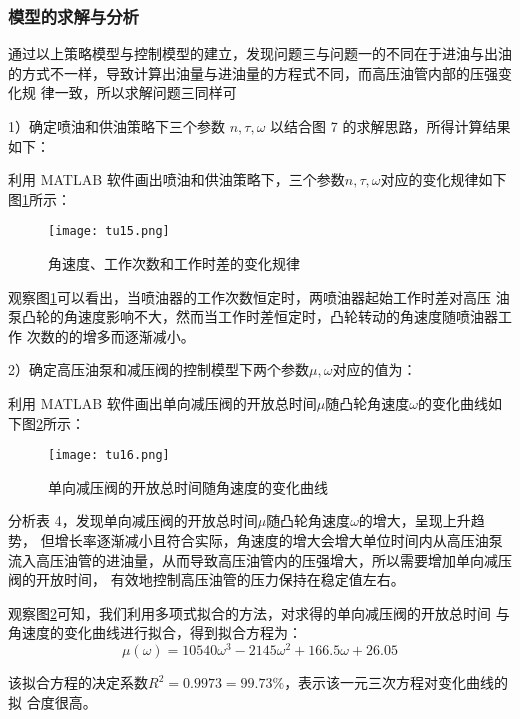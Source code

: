 \documentclass{cumcmthesis}
\begin{document}
\subsubsection{模型的求解与分析 }
通过以上策略模型与控制模型的建立，发现问题三与问题一的不同在于进油与出油 的方式不一样，导致计算出油量与进油量的方程式不同，而高压油管内部的压强变化规 律一致，所以求解问题三同样可

1）确定喷油和供油策略下三个参数 $n,\tau,\omega$ 以结合图 7 的求解思路，所得计算结果如下： 

利用 MATLAB 软件画出喷油和供油策略下，三个参数$n,\tau,\omega$对应的变化规律如下 图\ref{fig:15}所示： 

 \begin{figure}[htb] \centering 
	
	\texttt{[image: tu15.png]} 
	
	\caption{角速度、工作次数和工作时差的变化规律 } \label{fig:15}
\end{figure}  

观察图\ref{fig:15}可以看出，当喷油器的工作次数恒定时，两喷油器起始工作时差对高压 油泵凸轮的角速度影响不大，然而当工作时差恒定时，凸轮转动的角速度随喷油器工作 次数的的增多而逐渐减小。

2）确定高压油泵和减压阀的控制模型下两个参数$\mu,\omega$对应的值为： 

利用 MATLAB 软件画出单向减压阀的开放总时间$\mu$随凸轮角速度$\omega$的变化曲线如
下图\ref{fig:16}所示： 
 \begin{figure}[htb] \centering 
	
	\texttt{[image: tu16.png]} 
	
	\caption{单向减压阀的开放总时间随角速度的变化曲线} \label{fig:16}
\end{figure}  


分析表 4，发现单向减压阀的开放总时间$\mu$随凸轮角速度$\omega$的增大，呈现上升趋势， 但增长率逐渐减小且符合实际，角速度的增大会增大单位时间内从高压油泵流入高压油管的进油量，从而导致高压油管内的压强增大，所以需要增加单向减压阀的开放时间， 有效地控制高压油管的压力保持在稳定值左右。 

观察图\ref{fig:16}可知，我们利用多项式拟合的方法，对求得的单向减压阀的开放总时间 与角速度的变化曲线进行拟合，得到拟合方程为： 
\begin{equation}
\mu\left(\omega\right)=10540\omega^{3}-2145\omega^{2}+166.5\omega+26.05\label{eq:29}
\end{equation}

该拟合方程的决定系数$R^{2}=0.9973=99.73\%$，表示该一元三次方程对变化曲线的拟 合度很高。
\end{document}
